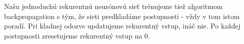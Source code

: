 Našu jednoduchú rekurentnú neurónovú sieť trénujeme tiež algoritmom backpropagation s tým, že sieti predkladáme postupnosti - vždy v tom istom poradí. Pri kladnej odozve updatujeme rekurentný vstup, ináč nie. Po každej postupnosti zresetujeme rekurentný vstup na 0.





